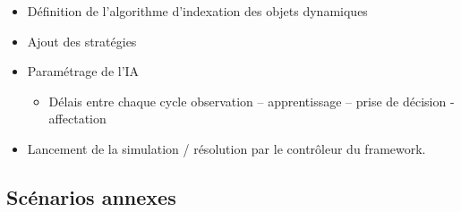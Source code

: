 \begin{itemize}
\item Définition de l'algorithme d'indexation des objets dynamiques
\item Ajout des stratégies
\item Paramétrage de l'IA
	\begin{itemize}
	\item Délais entre chaque cycle \og observation – apprentissage – prise de décision - affectation \fg
	\end{itemize}
\item Lancement de la simulation / résolution par le contrôleur du framework.
\end{itemize} %


\subsection{Scénarios annexes}

